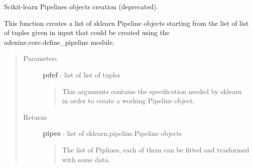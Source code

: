 \documentclass[letterpaper,10pt,english]{sphinxmanual}
\begin{document}
\label{index:module-adenine.core.pipelines}

\begin{fulllineitems}
\label{index:adenine.core.pipelines.create}
Scikit-learn Pipelines objects creation (deprecated).

This function creates a list of sklearn Pipeline objects starting from the
list of list of tuples given in input that could be created using the
adenine.core.define\_pipeline module.
\begin{quote}\begin{description}
\item[{Parameters}] \leavevmode
\textbf{pdef} : list of list of tuples
\begin{quote}

This arguments contains the specification needed by sklearn in order
to create a working Pipeline object.
\end{quote}

\item[{Returns}] \leavevmode
\textbf{pipes} : list of sklearn.pipeline.Pipeline objects
\begin{quote}

The list of Piplines, each of them can be fitted and trasformed
with some data.
\end{quote}

\end{description}\end{quote}

\end{fulllineitems}

\end{document}
